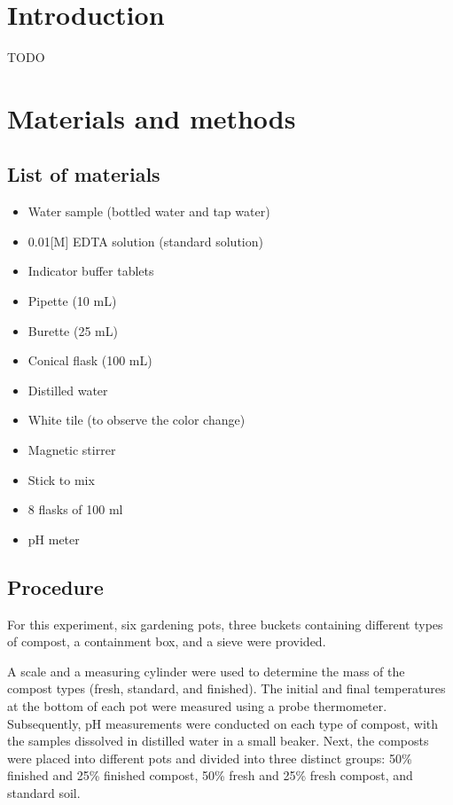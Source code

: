 \documentclass{article}
\begin{document}
\tableofcontents
\pagebreak

\section{Introduction}
TODO

\section{Materials and methods}
\subsection{List of materials}
\begin{itemize}
    \item Water sample (bottled water and tap water)
    \item 0.01[M] EDTA solution (standard solution)
    \item Indicator buffer tablets
    \item Pipette (10 mL)
    \item Burette (25 mL)
    \item Conical flask (100 mL)
    \item Distilled water
    \item White tile (to observe the color change)
    \item Magnetic stirrer
    \item Stick to mix
    \item 8 flasks of 100 ml
    \item pH meter
\end{itemize}

\subsection{Procedure}
For this experiment, six gardening pots, three buckets containing different types of 
compost, a containment box, and a sieve were provided.

A scale and a measuring cylinder were used to determine the mass of the compost types
(fresh, standard, and finished). The initial and final temperatures at the bottom of each
pot were measured using a probe thermometer. Subsequently, pH measurements were conducted on each type of compost, with the samples
dissolved in distilled water in a small beaker. Next, the composts were placed into different pots and divided into three distinct
groups: 50\% finished and 25\% finished compost, 50\% fresh and 25\% fresh compost, and
standard soil.
\end{document}
